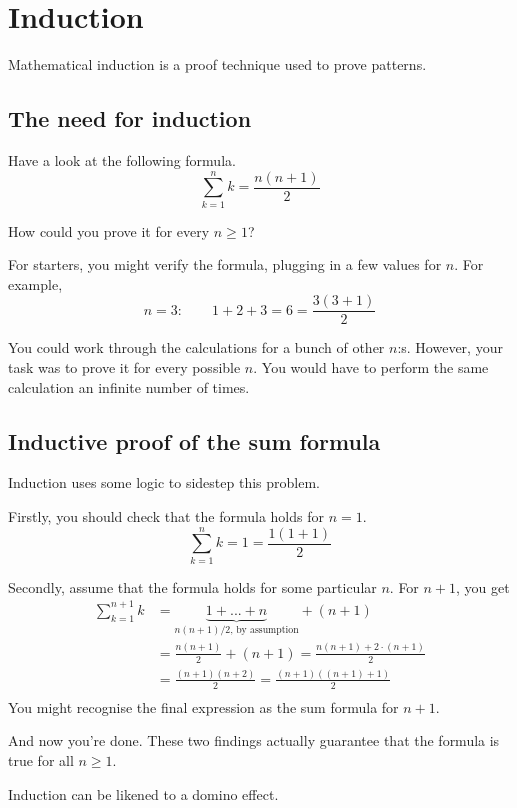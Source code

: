 \documentclass{scrreprt}
\begin{document}
\section*{Induction}

Mathematical induction is a proof technique used to prove patterns.

\subsection*{The need for induction}

Have a look at the following formula.
$$\sum_{k = 1}^n k = \frac{n(n + 1)}{2}$$

How could you prove it for every $n \geq 1$?

For starters, you might verify the formula, plugging in a few values for $n$. For example,
$$n = 3: \qquad 1 + 2 + 3 = 6 = \frac{3(3 + 1)}{2}$$

You could work through the calculations for a bunch of other $n$:s. However, your task was to prove it for every possible $n$. You would have to perform the same calculation an infinite number of times.

\subsection*{Inductive proof of the sum formula}
Induction uses some logic to sidestep this problem.

Firstly, you should check that the formula holds for $n = 1$.
$$\sum_{k = 1}^n k = 1 = \frac{1(1 + 1)}{2}$$

Secondly, assume that the formula holds for some particular $n$. For $n + 1$, you get
\begin{align*}
    \sum_{k = 1}^{n + 1} k &= \underbrace{1 + ... + n}_{n(n + 1)/2 \text{, by assumption}} + (n + 1) \\
    &= \frac{n(n + 1)}{2} + (n + 1) = \frac{n(n + 1) + 2 \cdot (n + 1)}{2}\\
    &= \frac{(n + 1)(n + 2)}{2} = \frac{(n + 1)((n + 1) + 1)}{2} \\
\end{align*}
You might recognise the final expression as the sum formula for $n + 1$.

And now you're done. These two findings actually guarantee that the formula is true for all $n \geq 1$.

Induction can be likened to a domino effect.

\end{document}
